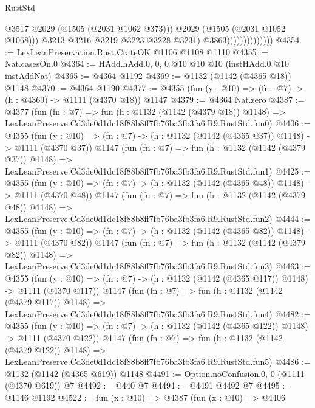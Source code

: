 \begin{lexlean}{RustStd}
\begin{coremodule}
                                      @3517
                                      @2029
                                      (@1505 (@2031 @1062 @373)))
                                    @2029
                                    (@1505 (@2031 @1052 @1068)))
                                  @3213
                                  @3216
                                  @3219
                                  @3223
                                  @3228
                                  @3231)
                                @3863))))))))))))))
@4354 := LexLeanPreservation.Rust.CrateOK @1106 @1108 @1110
@4355 := Nat.casesOn.{0}
@4364 := HAdd.hAdd.{0, 0, 0} @10 @10 @10 (instHAdd.{0} @10 instAddNat)
@4365 := @4364 @1192
@4369 := @1132 (@1142 (@4365 @18)) @1148
@4370 := @4364 @1190
@4377 := @4355 (fun (y : @10) => (fn : @7) -> (h : @4369) -> @1111 (@4370 @18)) @1147
@4379 := @4364 Nat.zero
@4387 := @4377
    (fun (fn : @7) =>
    fun (h : @1132 (@1142 (@4379 @18)) @1148) =>
    LexLeanPreserve.Cd3de0d1dc18f88b8ff7fb76ba3fb3fa6.R9.RustStd.fun0)
@4406 := @4355
    (fun (y : @10) => (fn : @7) -> (h : @1132 (@1142 (@4365 @37)) @1148) -> @1111 (@4370 @37))
    @1147
    (fun (fn : @7) =>
    fun (h : @1132 (@1142 (@4379 @37)) @1148) =>
    LexLeanPreserve.Cd3de0d1dc18f88b8ff7fb76ba3fb3fa6.R9.RustStd.fun1)
@4425 := @4355
    (fun (y : @10) => (fn : @7) -> (h : @1132 (@1142 (@4365 @48)) @1148) -> @1111 (@4370 @48))
    @1147
    (fun (fn : @7) =>
    fun (h : @1132 (@1142 (@4379 @48)) @1148) =>
    LexLeanPreserve.Cd3de0d1dc18f88b8ff7fb76ba3fb3fa6.R9.RustStd.fun2)
@4444 := @4355
    (fun (y : @10) => (fn : @7) -> (h : @1132 (@1142 (@4365 @82)) @1148) -> @1111 (@4370 @82))
    @1147
    (fun (fn : @7) =>
    fun (h : @1132 (@1142 (@4379 @82)) @1148) =>
    LexLeanPreserve.Cd3de0d1dc18f88b8ff7fb76ba3fb3fa6.R9.RustStd.fun3)
@4463 := @4355
    (fun (y : @10) => (fn : @7) -> (h : @1132 (@1142 (@4365 @117)) @1148) -> @1111 (@4370 @117))
    @1147
    (fun (fn : @7) =>
    fun (h : @1132 (@1142 (@4379 @117)) @1148) =>
    LexLeanPreserve.Cd3de0d1dc18f88b8ff7fb76ba3fb3fa6.R9.RustStd.fun4)
@4482 := @4355
    (fun (y : @10) => (fn : @7) -> (h : @1132 (@1142 (@4365 @122)) @1148) -> @1111 (@4370 @122))
    @1147
    (fun (fn : @7) =>
    fun (h : @1132 (@1142 (@4379 @122)) @1148) =>
    LexLeanPreserve.Cd3de0d1dc18f88b8ff7fb76ba3fb3fa6.R9.RustStd.fun5)
@4486 := @1132 (@1142 (@4365 @619)) @1148
@4491 := Option.noConfusion.{0, 0} (@1111 (@4370 @619)) @7
@4492 := @440 @7
@4494 := @4491 @4492 @7
@4495 := @1146 @1192
@4522 := fun (x : @10) =>
  @4387
    (fun (x : @10) =>
    @4406

\end{coremodule}
\end{lexlean}
